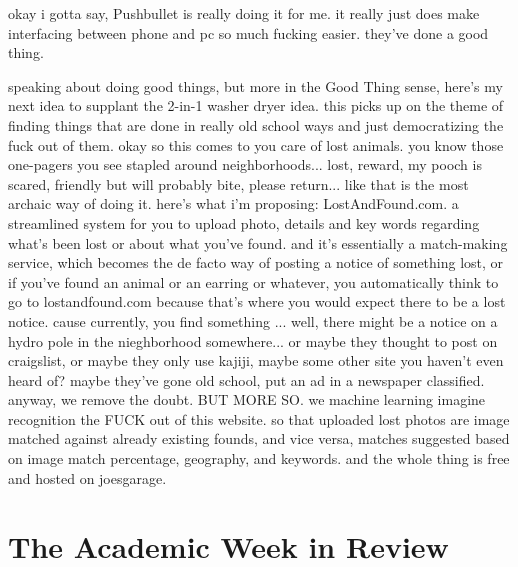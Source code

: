 \documentclass[12pt]{article}
\begin{document}
okay i gotta say, Pushbullet is really doing it for me. it really just does make interfacing between phone and pc so much fucking easier. they've done a good thing.

speaking about doing good things, but more in the Good Thing sense, here's my next idea to supplant the 2-in-1 washer dryer idea. this picks up on the theme of finding things that are done in really old school ways and just democratizing the fuck out of them. okay so this comes to you care of lost animals. you know those one-pagers you see stapled around neighborhoods... lost, reward, my pooch is scared, friendly but will probably bite, please return... like that is the most archaic way of doing it. here's what i'm proposing: LostAndFound.com. a streamlined system for you to upload photo, details and key words regarding what's been lost or about what you've found. and it's essentially a match-making service, which becomes the de facto way of posting a notice of something lost, or if you've found an animal or an earring or whatever, you automatically think to go to lostandfound.com because that's where you would expect there to be a lost notice. cause currently, you find something ... well, there might be a notice on a hydro pole in the nieghborhood somewhere... or maybe they thought to post on craigslist, or maybe they only use kajiji, maybe some other site you haven't even heard of? maybe they've gone old school, put an ad in a newspaper classified. anyway, we remove the doubt. BUT MORE SO. we machine learning imagine recognition the FUCK out of this website. so that uploaded lost photos are image matched against already existing founds, and vice versa, matches suggested based on image match percentage, geography, and keywords. and the whole thing is free and hosted on joesgarage.

\section*{The Academic Week in Review}
\end{document}
